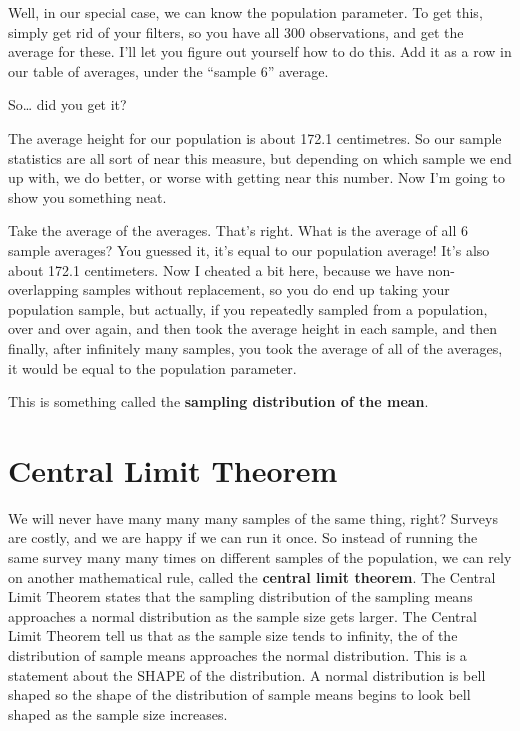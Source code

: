 \documentclass[
]{book}
\begin{document}
Well, in our special case, we can know the population parameter. To get this, simply get rid of your filters, so you have all 300 observations, and get the average for these. I'll let you figure out yourself how to do this. Add it as a row in our table of averages, under the ``sample 6'' average.

So\ldots{} did you get it?

The average height for our population is about 172.1 centimetres. So our sample statistics are all sort of near this measure, but depending on which sample we end up with, we do better, or worse with getting near this number. Now I'm going to show you something neat.

Take the average of the averages. That's right. What is the average of all 6 sample averages? You guessed it, it's equal to our population average! It's also about 172.1 centimeters. Now I cheated a bit here, because we have non-overlapping samples without replacement, so you do end up taking your population sample, but actually, if you repeatedly sampled from a population, over and over again, and then took the average height in each sample, and then finally, after infinitely many samples, you took the average of all of the averages, it would be equal to the population parameter.

This is something called the \textbf{sampling distribution of the mean}.

\hypertarget{central-limit-theorem}{%
\section{Central Limit Theorem}\label{central-limit-theorem}}

We will never have many many many samples of the same thing, right? Surveys are costly, and we are happy if we can run it once. So instead of running the same survey many many times on different samples of the population, we can rely on another mathematical rule, called the \textbf{central limit theorem}. The Central Limit Theorem states that the sampling distribution of the sampling means approaches a normal distribution as the sample size gets larger. The Central Limit Theorem tell us that as the sample size tends to infinity, the of the distribution of sample means approaches the normal distribution. This is a statement about the SHAPE of the distribution. A normal distribution is bell shaped so the shape of the distribution of sample means begins to look bell shaped as the sample size increases.
\end{document}
